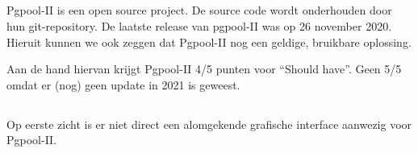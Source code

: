 \subsubsection{}
\label{subsubsec:Redundantie/Replicatie}

\subsubsection{}
\label{subsubsec:Failover}

\subsubsection{}
\label{subsubsec:Monitoring}

\subsection{}
\label{subsec:Should have}

Pgpool-II is een open source project. De source code wordt onderhouden door hun git-repository.
De laatste release van pgpool-II was op 26 november 2020. Hieruit kunnen we ook zeggen dat Pgpool-II nog een geldige, bruikbare oplossing.

Aan de hand hiervan krijgt Pgpool-II 4/5 punten voor “Should have”. Geen 5/5 omdat er (nog) geen update in 2021 is geweest.

\subsubsection{}
\label{subsubsec:Ondersteuning in 2020-2021}

\subsubsection{}
\label{subsubsec:Open source}

\subsection{}
\label{subsec:Could have}

Op eerste zicht is er niet direct een alomgekende grafische interface aanwezig voor Pgpool-II.

